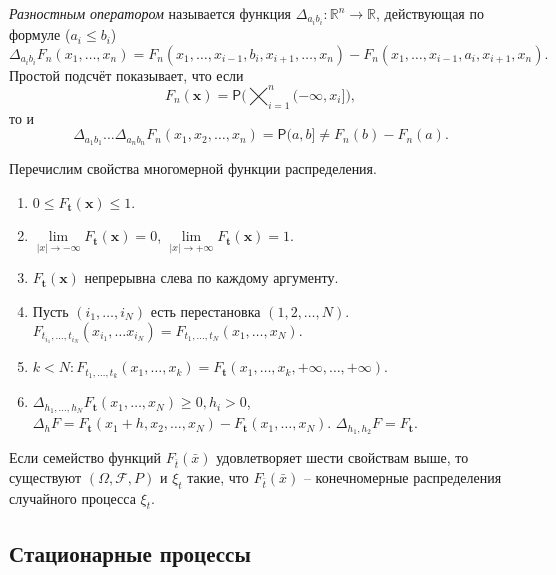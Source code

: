 \begin{definition}
  \emph{Разностным оператором} называется функция $ \Delta_{a_ib_i}\colon
  \mathbb{R}^n \to \mathbb{R} $, действующая по формуле ($ a_i \leqslant b_i
  $) 
  \[
    \Delta_{a_ib_i} F_n(x_1, \ldots, x_n) = F_n(x_1, \ldots, x_{i-1}, b_i,
    x_{i+1}, \ldots, x_n) - F_n(x_1, \ldots, x_{i-1}, a_i, x_{i+1}, x_n).
  \]
  Простой подсчёт показывает, что если  
  \[
    F_n(\mathbf{x}) = \mathsf P\bigg(\bigtimes_{i=1}^n (-\infty, x_i]\bigg),
  \]
  то и  
  \[
    \Delta_{a_1b_1}\dots\Delta_{a_nb_n} F_n(x_1, x_2, \dots, x_n) = \mathsf P(a,
    b] \neq F_n(b) - F_n(a).
  \] 
  
\end{definition}

Перечислим свойства многомерной функции распределения.
  \begin{enumerate}
    \item $0 \leqslant F_{\mathbf{t}} (\mathbf{x}) \leqslant 1$.
    \item $\lim\limits_{|x| \to -\infty} F_{\mathbf{t}} (\mathbf{x}) = 0$,
      $\lim\limits_{|x|\to +\infty} F_{\mathbf{t}}(\mathbf{x}) = 1$.
    \item $F_{\mathbf{t}} (\mathbf{x})$ непрерывна слева по каждому аргументу.
    \item Пусть $(i_1, \dots, i_N)$ есть перестановка $(1, 2, \dots, N)$.
      $F_{t_{i_1}, \dots, t_{i_N}} (x_{i_1}, \dots x_{i_N})
      = F_{t_1, \dots, t_N} (x_1, \dots, x_N).$
    \item $k < N \colon F_{t_1, \dots, t_k} (x_1, \dots, x_k) = F_{\mathbf{t}} (x_1,
      \dots, x_k, +\infty, \dots, +\infty)$.
    \item $\Delta_{h_1, \dots, h_N} F_{\mathbf{t}} (x_1, \dots, x_N) \geqslant
      0, h_i > 0$,
      $\Delta_h F = F_{\mathbf{t}} (x_1+h, x_2, \dots, x_N) - F_{\mathbf{t}}
      (x_1, \dots, x_N)$.
      $\Delta_{h_1, h_2} F = F_\mathbf{t} $.
  \end{enumerate}

\begin{theorem}[Колмогоров]
  Если семейство функций $F_{\bar{t}} (\bar{x})$ удовлетворяет шести свойствам
  выше,
  то существуют $ (\Omega, \mathcal{F}, P)$ и $\xi_t$ такие, что $F_{\bar{t}} (\bar{x})$ --
  конечномерные распределения случайного процесса $\xi_t$.
\end{theorem}

\subsection{Стационарные процессы}

